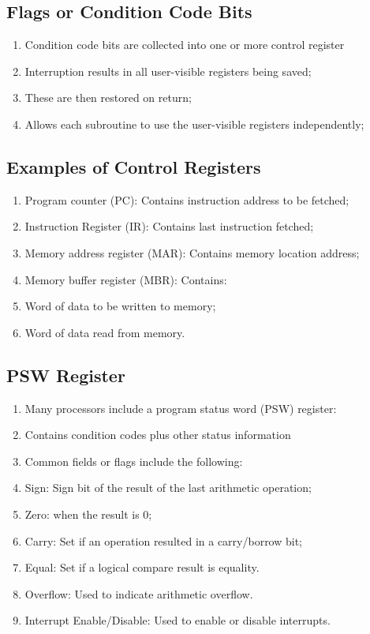 \documentclass[11pt]{article}
\begin{document}
\subsection{Flags or Condition Code Bits}
\begin{enumerate}
    \item Condition code bits are collected into one or more control register
    \item Interruption results in all user-visible registers being saved;
    \item These are then restored on return;
    \item Allows each subroutine to use the user-visible registers independently;
\end{enumerate}

\subsection{Examples of Control Registers}
\begin{enumerate}
    \item Program counter (PC): Contains instruction address to be fetched;
    \item Instruction Register (IR): Contains last instruction fetched;
    \item Memory address register (MAR): Contains memory location address;
    \item Memory buffer register (MBR): Contains:
    \item Word of data to be written to memory;
    \item Word of data read from memory.
\end{enumerate}

\subsection{PSW Register}
\begin{enumerate}
    \item Many processors include a program status word (PSW) register:
    \item Contains condition codes plus other status information
    \item Common fields or flags include the following:
    \item Sign: Sign bit of the result of the last arithmetic operation;
    \item Zero: when the result is 0;
    \item Carry: Set if an operation resulted in a carry/borrow bit;
    \item Equal: Set if a logical compare result is equality.
    \item Overflow: Used to indicate arithmetic overflow.
    \item Interrupt Enable/Disable: Used to enable or disable interrupts.
\end{enumerate}
\end{document}
